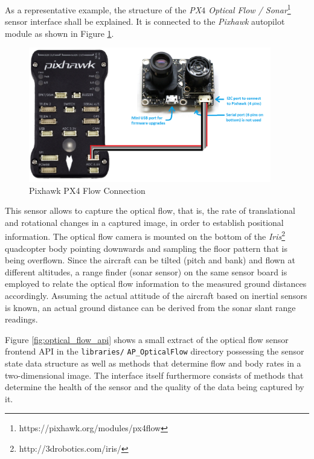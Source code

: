 \documentclass[paper=letter, fontsize=11pt]{scrartcl}
\numberwithin{equation}{section}
\numberwithin{figure}{section}
\numberwithin{table}{section}
\begin{document}
\par
As a representative example, the structure of the {\em PX$4$ Optical Flow /
Sonar}\footnote{https://pixhawk.org/modules/px4flow} sensor interface shall be
explained. It is connected to the {\em Pixhawk} autopilot module as shown in
Figure \ref{fig:pixhawk_px4_flow_connection}.

\begin{figure}[h]
	\centering
    \includegraphics[width=400px]{graphics/PixhawkPX4Flow.png}
	\caption{Pixhawk PX4 Flow Connection}
	\label{fig:pixhawk_px4_flow_connection}
\end{figure}

\par
This sensor allows to capture the optical flow, that is, the rate of
translational and rotational changes in a captured image, in order to establish
positional information. The optical flow camera is mounted on the bottom of the
{\em Iris}\footnote{http://3drobotics.com/iris/} quadcopter body pointing
downwards and sampling the floor pattern that is being overflown. Since the
aircraft can be tilted (pitch and bank) and flown at different altitudes, a
range finder (sonar sensor) on the same sensor board is employed to relate the
optical flow information to the measured ground distances accordingly. Assuming
the actual attitude of the aircraft based on inertial sensors is known, an
actual ground distance can be derived from the sonar slant range readings.

\par
Figure \ref{fig:optical_flow_api} shows a small extract of the optical flow
sensor frontend \ac{API} in the \texttt{libraries/} \texttt{AP\_OpticalFlow}
directory possessing the sensor state data structure as well as methods that determine
flow and body rates in a two-dimensional image. The interface itself
furthermore consists of methods that determine the health of the sensor and the
quality of the data being captured by it.
\end{document}

